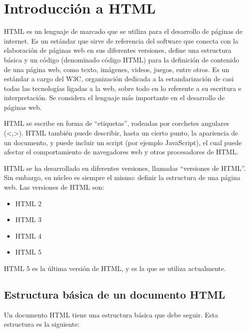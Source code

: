 \documentclass[
  a4paper,
  DIV=11,
  numbers=noendperiod,
  onepage,
  openany]{scrreprt}
\providecommand{\tightlist}{%
  \setlength{\itemsep}{0pt}\setlength{\parskip}{0pt}}\usepackage{longtable,booktabs,array}
\begin{document}
\chapter{Introducción a HTML}\label{introducciuxf3n-a-html}

HTML es un lenguaje de marcado que se utiliza para el desarrollo de
páginas de internet. Es un estándar que sirve de referencia del software
que conecta con la elaboración de páginas web en sus diferentes
versiones, define una estructura básica y un código (denominado código
HTML) para la definición de contenido de una página web, como texto,
imágenes, videos, juegos, entre otros. Es un estándar a cargo del W3C,
organización dedicada a la estandarización de casi todas las tecnologías
ligadas a la web, sobre todo en lo referente a su escritura e
interpretación. Se considera el lenguaje más importante en el desarrollo
de páginas web.

HTML se escribe en forma de ``etiquetas'', rodeadas por corchetes
angulares (\textless,\textgreater). HTML también puede describir, hasta
un cierto punto, la apariencia de un documento, y puede incluir un
script (por ejemplo JavaScript), el cual puede afectar el comportamiento
de navegadores web y otros procesadores de HTML.

HTML se ha desarrollado en diferentes versiones, llamadas ``versiones de
HTML''. Sin embargo, su núcleo es siempre el mismo: definir la
estructura de una página web. Las versiones de HTML son:

\begin{itemize}
\tightlist
\item
  HTML 2
\item
  HTML 3
\item
  HTML 4
\item
  HTML 5
\end{itemize}

HTML 5 es la última versión de HTML, y es la que se utiliza actualmente.

\section{Estructura básica de un documento
HTML}\label{estructura-buxe1sica-de-un-documento-html}

Un documento HTML tiene una estructura básica que debe seguir. Esta
estructura es la siguiente:
\end{document}
